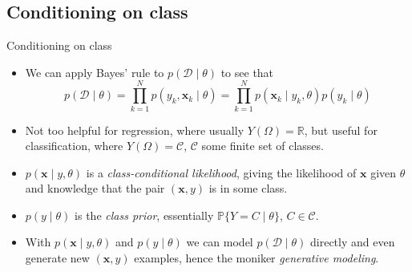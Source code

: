 \documentclass{beamer}
\numberwithin{equation}{section}
\begin{document}
\subsection{Conditioning on class}

\begin{frame}{Conditioning on class}
    \begin{itemize}
        \item
        We can apply Bayes' rule to $ p(\mathcal{D} \mid \theta) $ to see that
        \begin{equation*}
            p(\mathcal{D} \mid \theta) =
            \prod_{k = 1}^Np(y_k, \mathbf{x}_k \mid \theta) =
            \prod_{k = 1}^Np(\mathbf{x}_k \mid y_k, \theta)p(y_k \mid \theta)
        \end{equation*}

        \item
        Not too helpful for regression, where usually
        $ Y(\Omega) = \mathbb{R} $, but useful for classification, where
        $ Y(\Omega) = \mathcal{C} $, $ \mathcal{C} $ some finite set of
        classes.

        \item
        $ p(\mathbf{x} \mid y, \theta) $ is a \textit{class-conditional
        likelihood}, giving the likelihood of $ \mathbf{x} $ given $ \theta $
        and knowledge that the pair $ (\mathbf{x}, y) $ is in some class.

        \item
        $ p(y \mid \theta) $ is the \textit{class prior}, essentially
        $ \mathbb{P}\{Y = C \mid \theta\} $, $ C \in \mathcal{C} $.

        \item
        With $ p(\mathbf{x} \mid y, \theta) $ and $ p(y \mid \theta) $
        we can model $ p(\mathcal{D} \mid \theta) $ directly and even generate
        new $ (\mathbf{x}, y) $ examples, hence the moniker
        \textit{generative modeling}.
    \end{itemize}
\end{frame}
\end{document}
